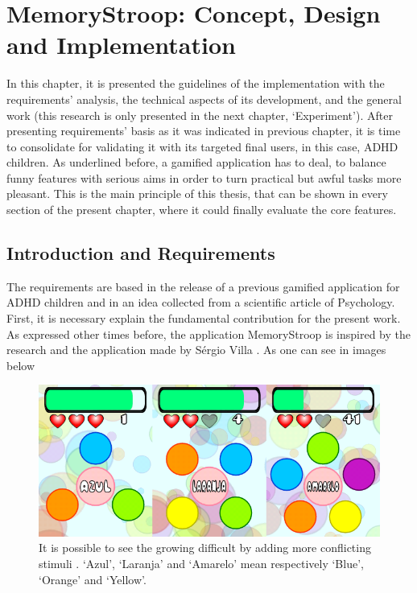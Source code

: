 \chapter{MemoryStroop: Concept, Design and Implementation}
\label{ch:development}

In this chapter, it is presented the guidelines of the implementation with the requirements' analysis, the technical aspects of its development, and the general work  (this research is only presented in the next chapter, `Experiment'). After presenting requirements' basis as it was indicated in previous chapter, it is time to consolidate for validating it with its targeted final users, in this case, ADHD children. As underlined before, a gamified application has to deal, to balance funny features with serious aims in order to turn practical but awful tasks more pleasant. This is the main principle of this thesis, that can be shown in every section of the present chapter, where it could finally evaluate the core features.

\section{Introduction and Requirements}

The requirements are based in the release of a previous gamified  application for ADHD children and in an idea collected from a scientific article of Psychology. First, it is necessary explain the fundamental contribution for the present work. As expressed other times before, the application MemoryStroop is inspired by the research and the application made by S\'{e}rgio Villa \citep{Villa}. As one can see in images below

\begin{figure}[htp]
\begin{center}
  \includegraphics[width=14cm]{chapters/desenvolvimento/img/fase1.png}
  \caption[First and second levels of Villa \textit{Colors}.]{It is possible to see the growing difficult by adding more conflicting stimuli \cite{Villa}. `Azul', `Laranja' and `Amarelo'  mean respectively `Blue', `Orange' and `Yellow'.	 }
  \label{first_and_second_colors}
\end{center}
\end{figure}


